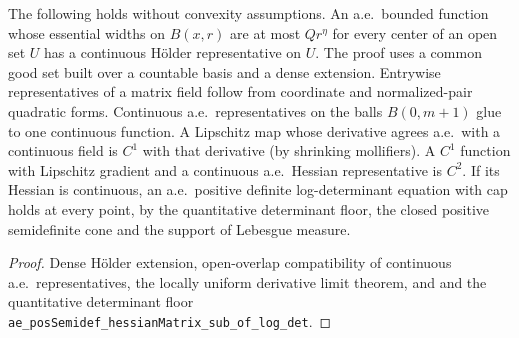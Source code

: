 \begin{lemma}
  \label{lem:holder-hessian-regularity}
  \leanok
  The following holds without convexity assumptions.
  An a.e.\ bounded function whose essential widths on $B(x,r)$ are at most $Qr^{\eta}$ for every center of an open set $U$
  has a continuous Hölder representative on $U$. The proof uses a common good set built over a countable basis and a dense
  extension. Entrywise representatives of a matrix field follow from coordinate and normalized-pair quadratic forms.
  Continuous a.e.\ representatives on the balls $B(0,m+1)$ glue to one continuous function. A Lipschitz map whose derivative
  agrees a.e.\ with a continuous field is $C^1$ with that derivative (by shrinking mollifiers). A $C^1$ function with
  Lipschitz gradient and a continuous a.e.\ Hessian representative is $C^2$. If its Hessian is continuous, an a.e.\ positive
  definite log-determinant equation with cap holds at every point, by the quantitative determinant floor, the closed
  positive semidefinite cone and the support of Lebesgue measure.
\end{lemma}
\begin{proof}
  \leanok
  Dense Hölder extension, open-overlap compatibility of continuous a.e.\ representatives, the locally uniform derivative
  limit theorem, and and the quantitative determinant floor
  \texttt{ae\_posSemidef\_hessianMatrix\_sub\_of\_log\_det}.
\end{proof}

